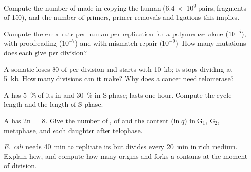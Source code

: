 \begin{exercise}[$\star\star$]\label{exo:b1:replication-mitosis:5}
Compute the number of  made in copying the human
 (\num{6.4e9} pairs, fragments of \qty{150}{}), and the number of
primers, primer removals and ligations this implies.
\end{exercise}

\begin{exercise}[$\star\star$]\label{exo:b1:replication-mitosis:6}
Compute the error rate per human  per replication for a
polymerase alone ($10^{-5}$), with proofreading ($10^{-7}$) and with
mismatch repair ($10^{-9}$). How many mutations does each give per
division?
\end{exercise}

\begin{exercise}[$\star\star$]\label{exo:b1:replication-mitosis:7}
A somatic  loses \qty{80}{}  of  per division
and starts with \qty{10}{kb}; it stops dividing at \qty{5}{kb}. How
many divisions can it make? Why does a cancer  need telomerase?
\end{exercise}

\begin{exercise}[$\star\star$]\label{exo:b1:replication-mitosis:8}
A  has \qty{5}{\%} of its  in  and \qty{30}{\%} in
S phase;  lasts one hour. Compute the cycle length and the
length of S phase.
\end{exercise}

\begin{exercise}[$\star\star$]\label{exo:b1:replication-mitosis:9}
A  has 2n $= 8$. Give the number of , of  and
the  content (in $q$) in G$_1$, G$_2$, metaphase, and each daughter
after telophase.
\end{exercise}

\begin{exercise}[$\star\star\star$]\label{exo:b1:replication-mitosis:10}
\emph{E. coli} needs \qty{40}{min} to replicate its  but
divides every \qty{20}{min} in rich medium. Explain how, and compute
how many origins and forks a  contains at the moment of division.
\end{exercise}

